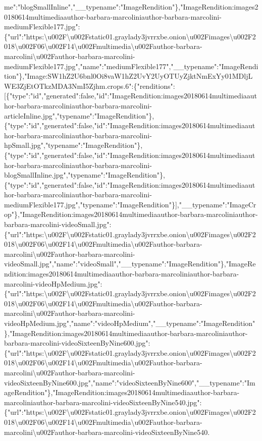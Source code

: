 me":"blogSmallInline","\_\_typename":"ImageRendition"\},"ImageRendition:images20180614multimediaauthor-barbara-marcoliniauthor-barbara-marcolini-mediumFlexible177.jpg":\{"url":"https:\textbackslash{}u002F\textbackslash{}u002Fstatic01.graylady3jvrrxbe.onion\textbackslash{}u002Fimages\textbackslash{}u002F2018\textbackslash{}u002F06\textbackslash{}u002F14\textbackslash{}u002Fmultimedia\textbackslash{}u002Fauthor-barbara-marcolini\textbackslash{}u002Fauthor-barbara-marcolini-mediumFlexible177.jpg","name":"mediumFlexible177","\_\_typename":"ImageRendition"\},"Image:SW1hZ2U6bnl0Oi8vaW1hZ2UvY2UyOTUyZjktNmExYy01MDljLWE3ZjEtOTkzMDA3NmI5Zjhm.crops.6":\{"renditions":{[}\{"type":"id","generated":false,"id":"ImageRendition:images20180614multimediaauthor-barbara-marcoliniauthor-barbara-marcolini-articleInline.jpg","typename":"ImageRendition"\},\{"type":"id","generated":false,"id":"ImageRendition:images20180614multimediaauthor-barbara-marcoliniauthor-barbara-marcolini-hpSmall.jpg","typename":"ImageRendition"\},\{"type":"id","generated":false,"id":"ImageRendition:images20180614multimediaauthor-barbara-marcoliniauthor-barbara-marcolini-blogSmallInline.jpg","typename":"ImageRendition"\},\{"type":"id","generated":false,"id":"ImageRendition:images20180614multimediaauthor-barbara-marcoliniauthor-barbara-marcolini-mediumFlexible177.jpg","typename":"ImageRendition"\}{]},"\_\_typename":"ImageCrop"\},"ImageRendition:images20180614multimediaauthor-barbara-marcoliniauthor-barbara-marcolini-videoSmall.jpg":\{"url":"https:\textbackslash{}u002F\textbackslash{}u002Fstatic01.graylady3jvrrxbe.onion\textbackslash{}u002Fimages\textbackslash{}u002F2018\textbackslash{}u002F06\textbackslash{}u002F14\textbackslash{}u002Fmultimedia\textbackslash{}u002Fauthor-barbara-marcolini\textbackslash{}u002Fauthor-barbara-marcolini-videoSmall.jpg","name":"videoSmall","\_\_typename":"ImageRendition"\},"ImageRendition:images20180614multimediaauthor-barbara-marcoliniauthor-barbara-marcolini-videoHpMedium.jpg":\{"url":"https:\textbackslash{}u002F\textbackslash{}u002Fstatic01.graylady3jvrrxbe.onion\textbackslash{}u002Fimages\textbackslash{}u002F2018\textbackslash{}u002F06\textbackslash{}u002F14\textbackslash{}u002Fmultimedia\textbackslash{}u002Fauthor-barbara-marcolini\textbackslash{}u002Fauthor-barbara-marcolini-videoHpMedium.jpg","name":"videoHpMedium","\_\_typename":"ImageRendition"\},"ImageRendition:images20180614multimediaauthor-barbara-marcoliniauthor-barbara-marcolini-videoSixteenByNine600.jpg":\{"url":"https:\textbackslash{}u002F\textbackslash{}u002Fstatic01.graylady3jvrrxbe.onion\textbackslash{}u002Fimages\textbackslash{}u002F2018\textbackslash{}u002F06\textbackslash{}u002F14\textbackslash{}u002Fmultimedia\textbackslash{}u002Fauthor-barbara-marcolini\textbackslash{}u002Fauthor-barbara-marcolini-videoSixteenByNine600.jpg","name":"videoSixteenByNine600","\_\_typename":"ImageRendition"\},"ImageRendition:images20180614multimediaauthor-barbara-marcoliniauthor-barbara-marcolini-videoSixteenByNine540.jpg":\{"url":"https:\textbackslash{}u002F\textbackslash{}u002Fstatic01.graylady3jvrrxbe.onion\textbackslash{}u002Fimages\textbackslash{}u002F2018\textbackslash{}u002F06\textbackslash{}u002F14\textbackslash{}u002Fmultimedia\textbackslash{}u002Fauthor-barbara-marcolini\textbackslash{}u002Fauthor-barbara-marcolini-videoSixteenByNine540.